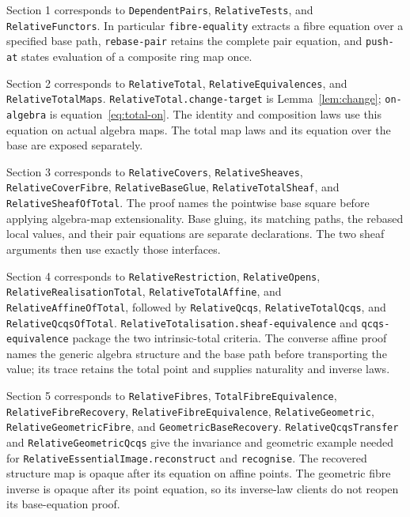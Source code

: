 \documentclass[11pt]{amsart}
\theoremstyle{definition}\newtheorem{definition}[theorem]{Definition}
\begin{document}
\begingroup\raggedright
Section 1 corresponds to \texttt{DependentPairs}, \texttt{RelativeTests},
and \texttt{RelativeFunctors}. In particular
\texttt{fibre-equality} extracts a fibre equation over a specified base
path, \texttt{rebase-pair} retains the complete pair equation, and
\texttt{push-at} states evaluation of a composite ring map once.

Section 2 corresponds to \texttt{RelativeTotal},
\texttt{RelativeEquivalences}, and \texttt{RelativeTotalMaps}.
\texttt{RelativeTotal.change-target} is Lemma~\ref{lem:change};
\texttt{on-algebra} is equation~\eqref{eq:total-on}. The identity and
composition laws use this equation on actual algebra maps. The total
map laws and its equation over the base are exposed separately.

Section 3 corresponds to \texttt{RelativeCovers},
\texttt{RelativeSheaves}, \texttt{RelativeCoverFibre},
\texttt{RelativeBaseGlue}, \texttt{RelativeTotalSheaf}, and
\texttt{RelativeSheafOfTotal}. The proof names the pointwise base square
before applying algebra-map extensionality. Base gluing, its matching
paths, the rebased local values, and their pair equations are separate
declarations. The two sheaf arguments then use exactly those interfaces.

Section 4 corresponds to \texttt{RelativeRestriction},
\texttt{RelativeOpens}, \texttt{RelativeRealisationTotal},
\texttt{RelativeTotalAffine}, and \texttt{RelativeAffineOfTotal},
followed by \texttt{RelativeQcqs}, \texttt{RelativeTotalQcqs}, and
\texttt{RelativeQcqsOfTotal}.
\texttt{RelativeTotalisation.sheaf-equivalence} and
\texttt{qcqs-equivalence} package the two intrinsic-total criteria.
The converse affine proof names the generic algebra structure and the
base path before transporting the value; its trace retains the total
point and supplies naturality and inverse laws.

Section 5 corresponds to \texttt{RelativeFibres},
\texttt{TotalFibreEquivalence}, \texttt{RelativeFibreRecovery},
\texttt{RelativeFibreEquivalence}, \texttt{RelativeGeometric},
\texttt{RelativeGeometricFibre}, and \texttt{GeometricBaseRecovery}.
\texttt{RelativeQcqsTransfer} and \texttt{RelativeGeometricQcqs}
give the invariance and geometric example needed for
\texttt{RelativeEssentialImage.reconstruct} and \texttt{recognise}.
The recovered structure map is opaque after its equation on affine
points. The geometric fibre inverse is opaque after its point equation,
so its inverse-law clients do not reopen its base-equation proof.
\end{document}
